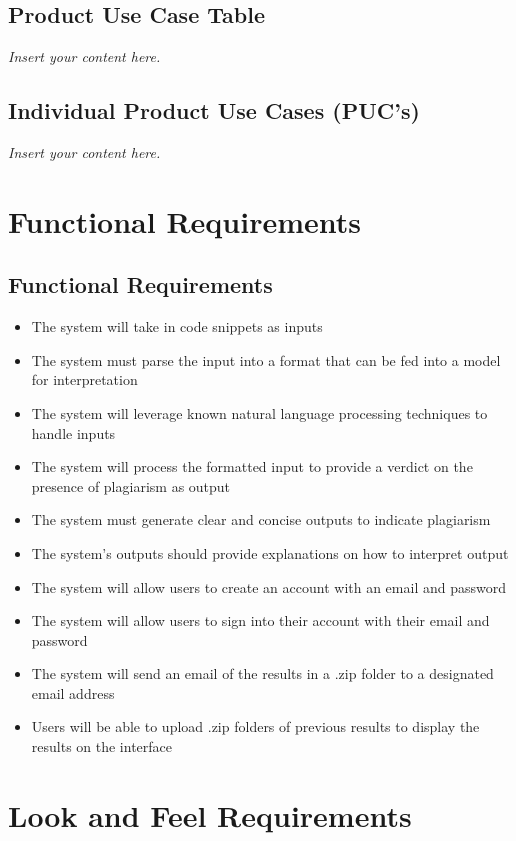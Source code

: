 \documentclass[12pt]{article}
\newcommand{\lips}{\textit{Insert your content here.}}
\begin{document}
\subsection{Product Use Case Table}
\lips
\subsection{Individual Product Use Cases (PUC's)}
\lips

\section{Functional Requirements}
\subsection{Functional Requirements}
\begin{itemize}
    \item The system will take in code snippets as inputs
    \item The system must parse the input into a format that can be fed into a model for interpretation
    \item The system will leverage known natural language processing techniques to handle inputs
    \item The system will process the formatted input to provide a verdict on the presence of plagiarism as output
    \item The system must generate clear and concise outputs to indicate plagiarism
    \item The system's outputs should provide explanations on how to interpret output
    \item The system will allow users to create an account with an email and password
    \item The system will allow users to sign into their account with their email and password
    \item The system will send an email of the results in a .zip folder to a designated email address
    \item Users will be able to upload .zip folders of previous results to display the results on the interface
\end{itemize}

\section{Look and Feel Requirements}
\end{document}
